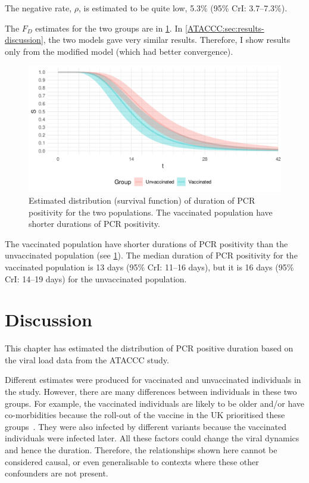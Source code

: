 \documentclass[thesis.tex]{subfiles}
\begin{document}
The negative rate, $\rho$, is estimated to be quite low, 5.3\% (95\% CrI: 3.7--7.3\%).

The $F_D$ estimates for the two groups are in \cref{ATACCC:fig:duration}.
In \cref{ATACCC:sec:results-discussion}, the two models gave very similar results.
Therefore, I show results only from the modified model (which had better convergence).
\begin{figure}
  \centering \includegraphics{ATACCC/duration}
  \caption[Duration of PCR positivity.]{Estimated distribution (survival function) of duration of PCR positivity for the two populations. The vaccinated population have shorter durations of PCR positivity.  \label{ATACCC:fig:duration}}
\end{figure}

The vaccinated population have shorter durations of PCR positivity than the unvaccinated population (see \cref{ATACCC:fig:duration}).
The median duration of PCR positivity for the vaccinated population is 13 days (95\% CrI: 11--16 days), but it is 16 days (95\% CrI: 14--19 days) for the unvaccinated population.

\section{Discussion}

This chapter has estimated the distribution of PCR positive duration based on the viral load data from the ATACCC study.

Different estimates were produced for vaccinated and unvaccinated individuals in the study.
However, there are many differences between individuals in these two groups.
For example, the vaccinated individuals are likely to be older and/or have co-morbidities because the roll-out of the vaccine in the UK prioritised these groups~\autocite{naoCovidVaccination}.
They were also infected by different variants because the vaccinated individuals were infected later.
All these factors could change the viral dynamics~\autocite{russellWithinhost} and hence the duration.
Therefore, the relationships shown here cannot be considered causal, or even generalisable to contexts where these other confounders are not present.
\end{document}
